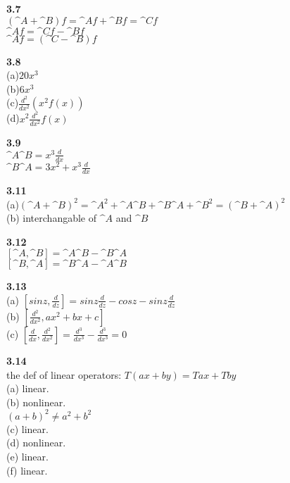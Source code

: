 \documentclass{article}
\begin{document}
\textbf{3.7}\\
$(\^{A}+\^{B})f = \^{A}f + \^{B}f = \^{C}f$\\
$\^{A}f = \^{C}f - \^{B}f$\\
$\^{A}f = (\^{C} - \^{B})f$\\
\newline

\textbf{3.8}\\
(a)$20x^3$\\
(b)$6x^3$\\
(c)$\frac{d^2}{dx^2}(x^2f(x))$\\
(d)$x^2\frac{d^2}{dx^2}f(x)$\\
\newline

\textbf{3.9}\\
$\^{A}\^{B} = x^3\frac{d}{dx}$\\
$\^{B}\^{A} = 3x^2 + x^3\frac{d}{dx}$\\
\newline

\textbf{3.11}\\
(a)$(\^{A}+\^{B})^2 = \^{A}^2 + \^{A}\^{B}+ \^{B}\^{A} + \^{B}^2 = (\^{B}+\^{A})^2$\\
(b) interchangable of $\^{A}$ and $\^{B}$\\
\newline

\textbf{3.12}\\
$[\^{A},\^{B}] = \^{A}\^{B}-\^{B}\^{A}$\\
$[\^{B},\^{A}] = \^{B}\^{A}-\^{A}\^{B}$\\
\newline

\textbf{3.13}\\
(a) $[sinz, \frac{d}{dz}] = sinz\frac{d}{dz} - cosz - sinz\frac{d}{dz}$\\
(b) $[\frac{d^2}{dx^2}, ax^2+bx+c]$\\
(c) $[\frac{d}{dx}, \frac{d^2}{dx^2}] = \frac{d^3}{dx^3} - \frac{d^3}{dx^3} = 0$\\
\newline

\textbf{3.14}\\
the def of linear operators: $T(ax+by) = Tax + Tby$\\
(a) linear.\\
(b) nonlinear.\\
$(a+b)^2 \neq a^2 + b^2$\\
(c) linear.\\
(d) nonlinear.\\
(e) linear.\\
(f) linear.\\
\newline
\end{document}
